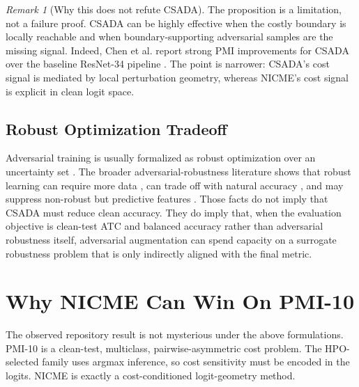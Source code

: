 \documentclass[11pt]{article}
\theoremstyle{definition}
\theoremstyle{plain}
\theoremstyle{remark}
\newtheorem{remark}{Remark}
\begin{document}
\begin{remark}[Why this does not refute CSADA]
The proposition is a limitation, not a failure proof.
CSADA can be highly effective when the costly boundary is locally reachable and when boundary-supporting adversarial samples are the missing signal.
Indeed, Chen et al. report strong PMI improvements for CSADA over the baseline ResNet-34 pipeline \cite{chen2025csada}.
The point is narrower: CSADA's cost signal is mediated by local perturbation geometry, whereas NICME's cost signal is explicit in clean logit space.
\end{remark}

\subsection{Robust Optimization Tradeoff}

Adversarial training is usually formalized as robust optimization over an uncertainty set \cite{madry2018towards}.
The broader adversarial-robustness literature shows that robust learning can require more data \cite{schmidt2018robust}, can trade off with natural accuracy \cite{zhang2019trades}, and may suppress non-robust but predictive features \cite{ilyas2019features}.
Those facts do not imply that CSADA must reduce clean accuracy.
They do imply that, when the evaluation objective is clean-test ATC and balanced accuracy rather than adversarial robustness itself, adversarial augmentation can spend capacity on a surrogate robustness problem that is only indirectly aligned with the final metric.

\section{Why NICME Can Win On PMI-10}

The observed repository result is not mysterious under the above formulations.
PMI-10 is a clean-test, multiclass, pairwise-asymmetric cost problem.
The HPO-selected family uses argmax inference, so cost sensitivity must be encoded in the logits.
NICME is exactly a cost-conditioned logit-geometry method.
\end{document}
